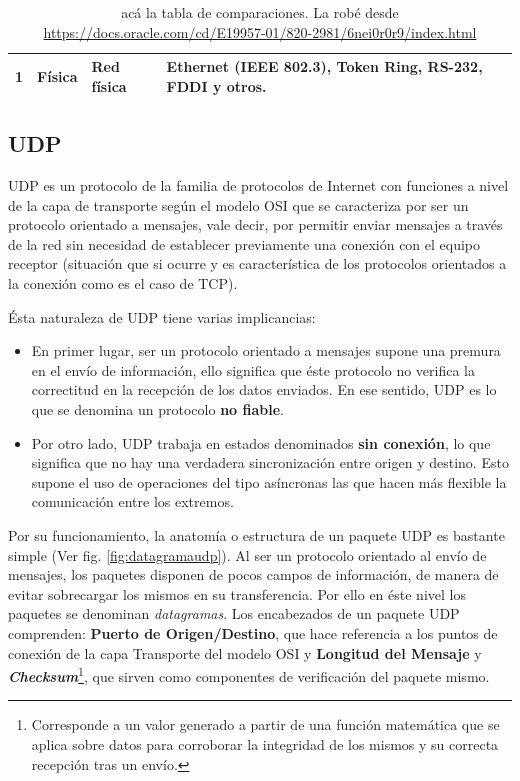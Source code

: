\begin{table}[h!]
\begin{tabular}{|c|p{4cm}|l|p{5cm}|}
1                                                                                            & Física                                                                                           & Red física                                & Ethernet (IEEE 802.3), Token Ring, RS-232, FDDI y otros.                                              \\ \hline
\end{tabular}
\caption{acá la tabla de comparaciones. La robé desde \url{https://docs.oracle.com/cd/E19957-01/820-2981/6nei0r0r9/index.html}}
\label{tabla:tcpiposi}
\end{table}


\subsection{UDP}
UDP \cite{rfc:768} es un protocolo de la familia de protocolos de Internet con funciones a nivel de la capa de transporte según el modelo OSI que se caracteriza por ser un protocolo orientado a mensajes, vale decir, por permitir enviar mensajes a través de la red sin necesidad de establecer previamente una conexión con el equipo receptor (situación que si ocurre y es característica de los protocolos orientados a la conexión como es el caso de TCP).

Ésta naturaleza de UDP tiene varias implicancias:
\begin{itemize}
\item En primer lugar, ser un protocolo orientado a mensajes supone una premura en el envío de información, ello significa que éste protocolo no verifica la correctitud en la recepción de los datos enviados. En ese sentido, UDP es lo que se denomina un protocolo \textbf{no fiable}.
\item Por otro lado, UDP trabaja en estados denominados \textbf{sin conexión}, lo que significa que no hay una verdadera sincronización entre origen y destino. Esto supone el uso de operaciones del tipo asíncronas las que hacen más flexible la comunicación entre los extremos.
\end{itemize}

Por su funcionamiento, la anatomía o estructura de un paquete UDP es bastante simple (Ver fig. \ref{fig:datagramaudp}). Al ser un protocolo orientado al envío de mensajes, los paquetes disponen de pocos campos de información, de manera de evitar sobrecargar los mismos en su transferencia. Por ello en éste nivel los paquetes se denominan \emph{datagramas}. Los encabezados de un paquete UDP comprenden: \textbf{Puerto de Origen/Destino}, que hace referencia a los puntos de conexión de la capa Transporte del modelo OSI y \textbf{Longitud del Mensaje} y \textbf{\emph{Checksum}}\footnote{Corresponde a un valor generado a partir de una función matemática que se aplica sobre datos para corroborar la integridad de los mismos y su correcta recepción tras un envío.}, que sirven como componentes de verificación del paquete mismo.

